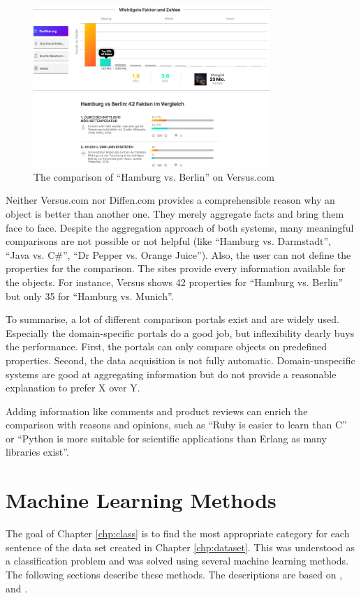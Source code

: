 \begin{figure}[htp]
    \centering
	\includegraphics[width=0.8\textwidth]{images/ds-sys/versus}
	\caption{The comparison of \enquote{Hamburg vs. Berlin} on Versus.com}
		\label{img:versus}
\end{figure}

Neither Versus.com nor Diffen.com provides a comprehensible reason why an object is better than another one. They merely aggregate facts and bring them face to face. Despite the aggregation approach of both systems, many meaningful comparisons are not possible or not helpful (like \enquote{Hamburg vs. Darmstadt}, \enquote{Java vs. C\#}, \enquote{Dr Pepper vs. Orange Juice}).
Also, the user can not define the properties for the comparison. The sites provide every information available for the objects. For instance, Versus shows 42 properties for \enquote{Hamburg vs. Berlin} but only 35 for \enquote{Hamburg vs. Munich}.
\newline

To summarise, a lot of different comparison portals exist and are widely used. Especially the domain-specific portals do a good job, but inflexibility dearly buys the performance. First, the portals can only compare objects on predefined properties. Second, the data acquisition is not fully automatic. Domain-unspecific systems are good at aggregating information but do not provide a reasonable explanation to prefer X over Y.

Adding information like comments and product reviews can enrich the comparison with reasons and opinions, such as \enquote{Ruby is easier to learn than C} or \enquote{Python is more suitable for scientific applications than Erlang as many libraries exist}.

\FloatBarrier

\section{Machine Learning Methods}
The goal of Chapter \ref{chp:class} is to find the most appropriate category for each sentence of the data set created in Chapter \ref{chp:dataset}. This was understood as a classification problem and was solved using several machine learning methods. The following sections describe these methods. The descriptions are based on \cite{mitchell1997machine}, \cite{friedman2001elements} and \cite{Goodfellow-et-al-2016}.


